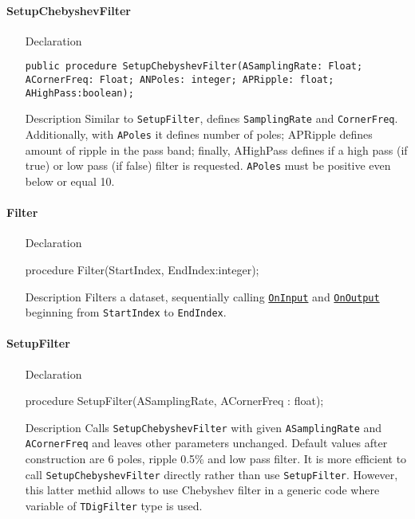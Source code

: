 \documentclass[12pt,a4paper,oneside]{report}
\newcommand{\declarationitem}[1]{{\addfontfeatures{FakeSlant} #1}}
\newcommand{\descriptiontitle}[1]{{\addfontfeatures{FakeSlant}#1}}
\newcommand{\code}[1]{\texttt{#1}}
\begin{document}
\paragraph{SetupChebyshevFilter}
\label{lmRecursFilters.TChebyshevFilter-SetupChebyshevFilter}
\begin{itemize}\item[\declarationitem{Declaration}\hfill]
	\begin{flushleft}
	\code{public procedure SetupChebyshevFilter(ASamplingRate: Float; ACornerFreq: Float; ANPoles: integer; APRipple: float; AHighPass:boolean);}
	\end{flushleft}
	\item[\descriptiontitle{Description}\hfill] Similar to \code{SetupFilter}, defines \code{SamplingRate} and \code{CornerFreq}. Additionally, with \code{APoles} it defines number of poles; APRipple defines amount of ripple in the pass band; finally, AHighPass defines if a high pass (if true) or low pass (if false) filter is requested. \code{APoles} must be positive even below or equal 10.
\end{itemize}
\paragraph{Filter}\hspace*{\fill}
\begin{itemize}
	\item[\declarationitem{Declaration}\hfill]
	\begin{flushleft}
	procedure Filter(StartIndex, EndIndex:integer);	
	\end{flushleft}
	\item[\descriptiontitle{Description}] Filters a dataset, sequentially calling \hyperref[lmfilters.TDigFilter-OnInput]{\code{OnInput}} and \hyperref[lmfilters.TDigFilter-OnOutput]{\code{OnOutput}} beginning from \code{StartIndex} to \code{EndIndex}.
\end{itemize}	
\paragraph{SetupFilter}\hspace*{\fill}
\begin{itemize}
	\item[\declarationitem{Declaration}\hfill]
	\begin{flushleft}
		procedure SetupFilter(ASamplingRate, ACornerFreq : float);
	\end{flushleft}
	\item[\descriptiontitle{Description}] Calls \code{SetupChebyshevFilter} with given \code{ASamplingRate} and \code{ACornerFreq} and leaves other parameters unchanged. Default values after construction are 6 poles, ripple 0.5\% and low pass filter. It is more efficient to call \code{SetupChebyshevFilter} directly rather than use \code{SetupFilter}. However, this latter methid allows to use Chebyshev filter in a generic code where variable of \code{TDigFilter} type is used.
\end{itemize}	
\end{document}
